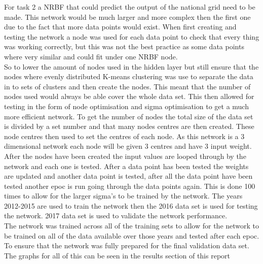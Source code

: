 \documentclass{IEEEtran}
\begin{document}
\begin{flushleft}
  For task 2 a NRBF that could predict the output of the national grid need to be made.
  This network would be much larger and more complex then the first one due to the fact that more
  data points would exist. When first creating and testing the network a node was used for each
  data point to check that every thing was working correctly, but this was not the best practice
  as some data points where very similar and could fit under one NRBF node.
  \\
  \vspace{2.5mm}
  So to lower the amount of nodes used in the hidden layer but still ensure that the nodes where
  evenly distributed K-means clustering was use to separate the data in to sets of clusters and then
  create the nodes. This meant that the number of nodes used would always be able cover the whole data set.
  This then allowed for testing in the form of node optimisation and sigma optimisation to get a much more
  efficient network. To get the number of nodes the total size of the data set is divided by a set number
  and that many nodes centres are then created. These node centres then used to set the centres of each node.
  As this network is a 3 dimensional network each node will be given 3 centres and have 3 input weight.
  \\
  \vspace{2.5mm}
  After the nodes have been created the input values are looped through by the network and each one is tested.
  After a data point has been tested the weights are updated and another data point is tested, after all the data point
  have been tested another epoc is run going through the data points again. This is done 100 times to allow
  for the larger sigma's to be trained by the network. The years 2012-2015 are used to train the network then the 2016
  data set is used for testing the network. 2017 data set is used to validate the network performance.
  \\
  \vspace{2.5mm}
  The network was trained across all of the training sets to allow for the network to be trained on all of the data
  available over those years and tested after each epoc. To ensure that the network was fully prepared for the
  final validation data set.
  \\
  \vspace{1.5mm}
  The graphs for all of this can be seen in the results section of this report

\end{flushleft}
\end{document}
